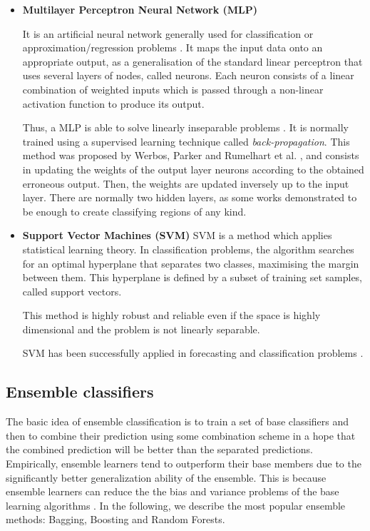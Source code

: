 \documentclass[a4paper,10pt,onecolumn,preprint,3p]{elsarticle}
\begin{document}
\begin{itemize}
\item \textbf{Multilayer Perceptron Neural Network (MLP)}

It is an artificial neural network generally used for classification or 
approximation/regression problems \cite{Rosenblatt1962,Widrow1990}. It maps the input data onto an appropriate output, as a generalisation of the standard linear perceptron that uses several layers of nodes, called neurons. Each neuron consists of a linear combination of weighted inputs which is passed through a non-linear activation function to produce its output.

Thus, a MLP is able to solve linearly inseparable problems \cite{SteinwenderBitzer2003}. It is normally trained using a supervised learning 
technique called \textit{back-propagation}. This method was proposed by Werbos, Parker and Rumelhart et al. \cite{Werbos1974,Parker1985,Rumelhart1985}, and consists in updating the weights of the output layer neurons according to the obtained erroneous output. Then, the weights are updated inversely up to the input layer.
There are normally two hidden layers, as some works \cite{Lippmann1987,Bishop1996} demonstrated to be enough to 
create classifying regions of any kind.


\item \textbf{Support Vector Machines (SVM)}
SVM \cite{Cortes1995,Shevade2000} is a method which applies statistical learning theory. In classification problems, the algorithm searches for an optimal hyperplane that separates two classes, maximising the margin between them. 
This hyperplane is defined by a subset of training set samples, called support vectors.

This method is highly robust and reliable even if the space is highly dimensional and the problem is not linearly separable.

SVM has been successfully applied in forecasting and classification problems \cite{Cao2003,MinSVM05,Jari2008}.


\end{itemize}



\subsection{Ensemble classifiers}
\label{subsec:ensembles}

The basic idea of ensemble classification is to train a set of base classifiers and then to combine their prediction using some combination scheme in a hope that the combined prediction will be better than the separated predictions. Empirically, ensemble learners tend to outperform their base members due to the significantly better generalization ability of the ensemble. This is because ensemble learners can reduce the the bias and variance problems of the base learning algorithms \cite{dietterich2002ensemble}. In the following, we describe the most popular ensemble methods: Bagging, Boosting and Random Forests.
\end{document}
